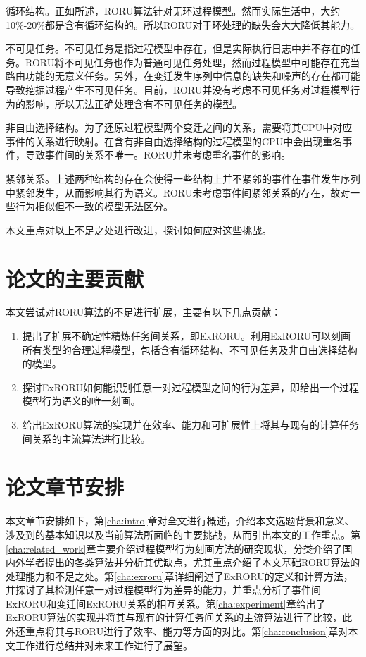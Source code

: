 {\heiti 循环结构。}正如所述，RORU算法针对无环过程模型。然而实际生活中，大约10\%-20\%都是含有循环结构的。所以RORU对于环处理的缺失会大大降低其能力。

{\heiti 不可见任务。}不可见任务是指过程模型中存在，但是实际执行日志中并不存在的任务。RORU将不可见任务也作为普通可见任务处理，然而过程模型中可能存在充当路由功能的无意义任务。另外，在变迁发生序列中信息的缺失和噪声的存在都可能导致挖掘过程产生不可见任务。目前，RORU并没有考虑不可见任务对过程模型行为的影响，所以无法正确处理含有不可见任务的模型。

{\heiti 非自由选择结构。}为了还原过程模型两个变迁之间的关系，需要将其CPU中对应事件的关系进行映射。在含有非自由选择结构的过程模型的CPU中会出现重名事件，导致事件间的关系不唯一。RORU并未考虑重名事件的影响。

{\heiti 紧邻关系。}上述两种结构的存在会使得一些结构上并不紧邻的事件在事件发生序列中紧邻发生，从而影响其行为语义。RORU未考虑事件间紧邻关系的存在，故对一些行为相似但不一致的模型无法区分。

本文重点对以上不足之处进行改进，探讨如何应对这些挑战。

\section{论文的主要贡献}\label{sec:contribution}
本文尝试对RORU算法\cite{jin2014computing}的不足进行扩展，主要有以下几点贡献：
\begin{enumerate}[1.]
  \item 提出了扩展不确定性精炼任务间关系，即ExRORU。利用ExRORU可以刻画所有类型的合理过程模型，包括含有循环结构、不可见任务及非自由选择结构的模型。
  \item 探讨ExRORU如何能识别任意一对过程模型之间的行为差异，即给出一个过程模型行为语义的唯一刻画。
  \item 给出ExRORU算法的实现并在效率、能力和可扩展性上将其与现有的计算任务间关系的主流算法进行比较。
\end{enumerate}

\section{论文章节安排}\label{sec:structure}
本文章节安排如下，第\ref{cha:intro}章对全文进行概述，介绍本文选题背景和意义、涉及到的基本知识以及当前算法所面临的主要挑战，从而引出本文的工作重点。第\ref{cha:related_work}章主要介绍过程模型行为刻画方法的研究现状，分类介绍了国内外学者提出的各类算法并分析其优缺点，尤其重点介绍了本文基础RORU算法的处理能力和不足之处。第\ref{cha:exroru}章详细阐述了ExRORU的定义和计算方法，并探讨了其检测任意一对过程模型行为差异的能力，并重点分析了事件间ExRORU和变迁间ExRORU关系的相互关系。第\ref{cha:experiment}章给出了ExRORU算法的实现并将其与现有的计算任务间关系的主流算法进行了比较，此外还重点将其与RORU进行了效率、能力等方面的对比。第\ref{cha:conclusion}章对本文工作进行总结并对未来工作进行了展望。